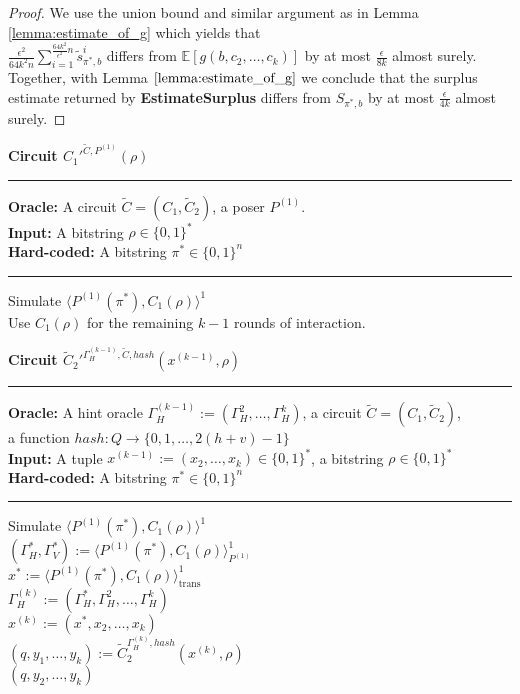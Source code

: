 \begin{proof}
We use the union bound and similar argument as in Lemma \ref{lemma:estimate_of_g}
which yields that \\$\frac{\epsilon^2}{64k^2n} \sum_{i=1}^{\frac{64k^2}{\epsilon^2}n} \widetilde{s}_{\pi^*,b}^i$ differs from
$\mathbb{E}[g(b, c_2, \dots, c_k)]$ by at most $\frac{\epsilon}{8k}$ almost surely. Together, with Lemma $\ref{lemma:estimate_of_g}$ we conclude that the surplus estimate
returned by \textbf{EstimateSurplus} differs from $S_{\pi^*,b}$ by at most $\frac{\epsilon}{4k}$ almost surely.
\end{proof}
%
%
\begin{codeblock}
  \textbf{Circuit $C_1'^{\widetilde{C}, P^{(1)}}(\rho)$}
  \medskip \hrule \medskip
  \textbf{Oracle:} A circuit $\widetilde{C} = (C_1, \widetilde{C}_2)$, a poser $P^{(1)}$. \\
  \textbf{Input:}  A bitstring $\rho \in \{0,1\}^{*}$ \\
  \textbf{Hard-coded:} A bitstring $\pi^* \in \{0,1\}^{n}$
  \medskip\hrule\medskip
  Simulate $\langle P^{(1)}(\pi^*), C_1(\rho)\rangle^1$ \\
  Use $C_1(\rho)$ for the remaining $k-1$ rounds of interaction.
\end{codeblock}
%
%
\begin{codeblock}
  \textbf{Circuit $\widetilde{C}_2'^{\Gamma_H^{(k-1)}, \widetilde{C}, hash}(x^{(k-1)}, \rho)$}
  \medskip \hrule \medskip
  \textbf{Oracle:} A hint oracle $\Gamma_H^{(k-1)} := (\Gamma_H^{2}, \dots, \Gamma_H^{k})$, a circuit $\widetilde{C} = (C_1, \widetilde{C}_2)$, \\
  \IndII a function $hash: Q \rightarrow \{0,1,\dots, 2(h+v)-1\}$ \\
  \textbf{Input:}  A tuple $x^{(k-1)} := (x_2, \dots, x_{k}) \in \{0,1\}^{*}$, a bitstring $\rho \in \{0,1\}^{*}$\\
  \textbf{Hard-coded:} A bitstring $\pi^* \in \{0,1\}^{n}$
  \medskip\hrule\medskip
  Simulate $\langle P^{(1)}(\pi^*), C_1(\rho) \rangle^{1}$ \\
  \IndI $(\Gamma_H^*, \Gamma_V^*) := \langle P^{(1)}(\pi^*), C_1(\rho) \rangle^{1}_{P^{(1)}}$ \\
  \IndI $x^* := \langle P^{(1)}(\pi^*), C_1(\rho) \rangle^{1}_{\text{trans}}$ \\
  $\Gamma_H^{(k)} := (\Gamma_H^*, \Gamma_H^{2}, \dots, \Gamma_H^{k})$ \\
  $x^{(k)} := (x^*, x_2, \dots, x_{k})$ \\
  $(q, y_1, \dots, y_k) := \widetilde{C}_2^{\Gamma_H^{(k)}, hash}(x^{(k)}, \rho)$ \\
  \Return $(q, y_2, \dots, y_k)$
\end{codeblock}
